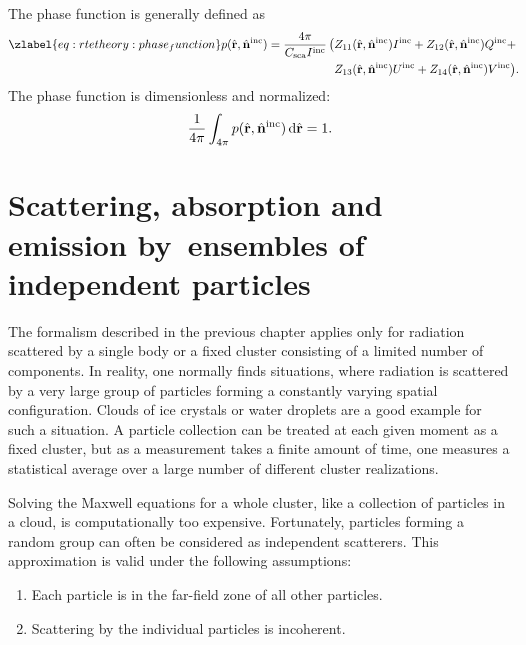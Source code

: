 The phase function is generally defined as
\begin{eqnarray}\zlabel{eq:rtetheory:phase_function}
  p(\hat{\VctStl{r}}, \hat{\VctStl{n}}^{\inc}) =
    \frac{4\pi}{C_{\sca} I^{\inc}} \, \bigl( &
         Z_{11}(\hat{\VctStl{r}}, \hat{\VctStl{n}}^{\inc})I^{\inc}
       + Z_{12}(\hat{\VctStl{r}}, \hat{\VctStl{n}}^{\inc})Q^{\inc} \rlap{${}+$} \\
    &    Z_{13}(\hat{\VctStl{r}}, \hat{\VctStl{n}}^{\inc})U^{\inc}
       + Z_{14}(\hat{\VctStl{r}}, \hat{\VctStl{n}}^{\inc})V^{\inc} \rlap{$\bigr)$.}
 \end{eqnarray}
The phase function is dimensionless and normalized:
\begin{equation}
  \frac{1}{4\pi}\int_{4\pi} 
  p(\hat{\mathbf{r}}, \hat{\mathbf{n}}^{\mathrm{inc}}) \,\mathrm{d}\hat{\mathbf{r}} = 1.
\end{equation}



\section[Particle Ensembles]{Scattering, absorption and emission by~ensembles of independent particles}

The formalism described in the previous chapter applies only for
radiation scattered by a single body or a fixed cluster consisting of
a limited number of components. In reality, one normally finds
situations, where radiation is scattered by a very large group of
particles forming a constantly varying spatial configuration. Clouds
of ice crystals or water droplets are a good example for such a
situation. A particle collection can be treated at each given moment
as a fixed cluster, but as a measurement takes a finite amount of
time, one measures a statistical average over a large number of
different cluster realizations.

Solving the Maxwell equations for a whole cluster, like a collection
of particles in a cloud, is computationally too expensive.
Fortunately, particles forming a random group can often be considered
as independent scatterers. This approximation is valid under the
following assumptions:
\begin{enumerate}
\item Each particle is in the far-field zone of all other particles.
\item Scattering by the individual particles is incoherent.
\end{enumerate}

